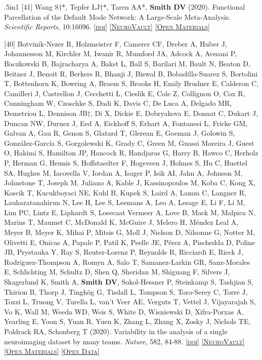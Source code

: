 \documentclass[11pt, letterpaper]{article}
\newcommand{\doi}[1]{\href{#1}{\scriptsize\textsc{[doi]}}} %
\newcommand{\neurovault}[1]{\href{#1}{\scriptsize\textsc{[NeuroVault]}}}
\newcommand{\materials}[1]{\href{#1}{\scriptsize\textsc{[Open Materials]}}}
\newcommand{\data}[1]{\href{#1}{\scriptsize\textsc{[Open Data]}}}
\begin{document}
\begin{hangparas}{.5in}{1}
[41] Wang S†*, Tepfer LJ†*, Taren AA*, \textbf{Smith DV} (2020). Functional Parcellation of the Default Mode Network: A Large-Scale Meta-Analysis. \textit{Scientific Reports}, 10:16096. \doi{https://doi.org/10.1038/s41598-020-72317-8} \neurovault{https://identifiers.org/neurovault.collection:6262} \materials{https://zenodo.org/record/3599989\#.Xl2u4y2ZPOQ} 

[40] Botvinik-Nezer R, Holzmeister F, Camerer CF, Dreber A, Huber J, Johannesson M, Kirchler M, Iwanir R, Mumford JA, Adcock A, Avesani P, Baczkowski B, Bajracharya A, Bakst L, Ball S, Barilari M, Bault N, Beaton D, Beitner J, Benoit R, Berkers R, Bhanji J, Biswal B, Bobadilla-Suarez S, Bortolini T, Bottenhorn K, Bowring A, Braem S, Brooks H, Emily Brudner E, Calderon C, Camilleri J, Castrellon J, Cecchetti L, Cieslik E, Cole Z, Collignon O, Cox R, Cunningham W, Czoschke S, Dadi K, Davis C, De Luca A, Delgado MR, Demetriou L, Dennison JB†, Di X, Dickie E, Dobryakova E, Donnat C, Dukart J, Duncan NW, Durnez J, Eed A, Eickhoff S, Erhart A, Fontanesi L, Fricke GM, Galvan A, Gau R, Genon S, Glatard T, Glerean E, Goeman J,  Golowin S, González-García S, Gorgolewski K, Grady C, Green M, Guassi Moreira J, Guest O, Hakimi S, Hamilton JP, Hancock R, Handjaras G, Harry B, Hawco C, Herholz P, Herman G, Heunis S, Hoffstaedter F, Hogeveen J, Holmes S, Hu C, Huettel SA, Hughes M, Iacovella V, Iordan A, Isager P, Isik AI, Jahn A, Johnson M, Johnstone T, Joseph M, Juliano A, Kable J, Kassinopoulos M, Koba C, Kong X, Koscik T, Kucukboyaci NE, Kuhl B, Kupek S, Laird A, Lamm C, Langner R, Lauharatanahirun N, Lee H, Lee S, Leemans A, Leo A, Lesage E, Li F, Li M, Lim PC, Lintz E, Liphardt S, Losecaat Vermeer A, Love B, Mack M, Malpica N, Marins T, Maumet C, McDonald K, McGuire J, Melero H, Méndez Leal A, Meyer B, Meyer K, Mihai P, Mitsis G, Moll J, Nielson D, Nilsonne G, Notter M, Olivetti E, Onicas A, Papale P, Patil K, Peelle JE, Pérez A, Pischedda D, Poline JB, Prystauka Y, Ray S, Reuter-Lorenz P, Reynolds R, Ricciardi E, Rieck J, Rodriguez-Thompson A, Romyn A, Salo T, Samanez-Larkin GR, Sanz-Morales E, Schlichting M, Schultz D, Shen Q, Sheridan M, Shiguang F, Silvers J, Skagerlund K, Smith A, \textbf{Smith DV}, Sokol-Hessner P, Steinkamp S, Tashjian S, Thirion B, Thorp J, Tinghög G, Tisdall L, Tompson S, Toro-Serey C, Torre J, Tozzi L, Truong V, Turella L, van’t Veer AE, Verguts T, Vettel J, Vijayarajah S, Vo K, Wall M, Weeda WD, Weis S, White D, Wisniewski D, Xifra-Porxas A, Yearling E, Yoon S, Yuan R, Yuen K, Zhang L, Zhang X, Zosky J, Nichols TE, Poldrack RA, Schonberg T (2020). Variability in the analysis of a single neuroimaging dataset by many teams. \textit{Nature}, 582, 84-88. \doi{https://doi.org/10.1038/s41586-020-2314-9} \neurovault{https://neurovault.org/collections/6047/} \materials{https://github.com/poldrack/narps} \data{https://openneuro.org/datasets/ds001734/versions/1.0.4} 


\end{hangparas}
\end{document}
